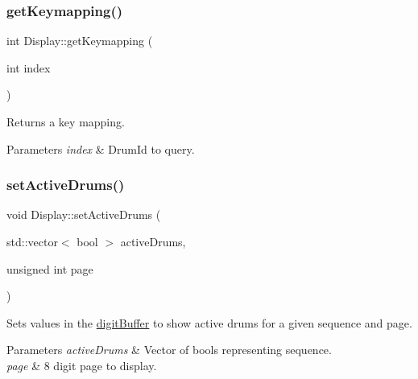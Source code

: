 \subsubsection{\texorpdfstring{get\+Keymapping()}{getKeymapping()}}
{\footnotesize\ttfamily int Display\+::get\+Keymapping (\begin{DoxyParamCaption}\item[{int}]{index }\end{DoxyParamCaption})}

Returns a key mapping. 
\begin{DoxyParams}{Parameters}
{\em index} & Drum\+Id to query. \\
\hline
\end{DoxyParams}
\mbox{\label{classdrumpi_1_1Display_ad80799724d362dcbb260d368bfdc18c3}} 
\subsubsection{\texorpdfstring{set\+Active\+Drums()}{setActiveDrums()}}
{\footnotesize\ttfamily void Display\+::set\+Active\+Drums (\begin{DoxyParamCaption}\item[{std\+::vector$<$ bool $>$}]{active\+Drums,  }\item[{unsigned int}]{page }\end{DoxyParamCaption})\hspace{0.3cm}{\ttfamily [private]}}

Sets values in the \hyperlink{classdrumpi_1_1Max7219_ab26f32728dd82c00e39b6212436f291e}{digit\+Buffer} to show active drums for a given sequence and page.


\begin{DoxyParams}{Parameters}
{\em active\+Drums} & Vector of bools representing sequence. \\
\hline
{\em page} & 8 digit page to display. \\
\hline
\end{DoxyParams}
\mbox{\label{classdrumpi_1_1Display_a7ddc806af584e6cde78b68400aac9a32}} 
